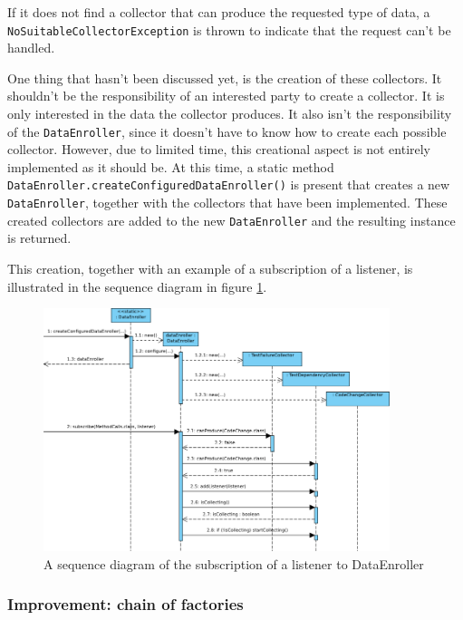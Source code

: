 \documentclass[i2]{oss}
\newcommand{\class}[1]{\texttt{#1}}
\newcommand{\method}[1]{\texttt{#1}}
\begin{document}
If it does not find a collector that can produce the requested type of data, a \class{NoSuitableCollectorException} is thrown to indicate that the request can't be handled.

One thing that hasn't been discussed yet, is the creation of these collectors.
It shouldn't be the responsibility of an interested party to create a collector. 
It is only interested in the data the collector produces.
It also isn't the responsibility of the \class{DataEnroller}, since it doesn't have to know how to create each possible collector.
However, due to limited time, this creational aspect is not entirely implemented as it should be.
At this time, a static method \method{DataEnroller.createConfiguredDataEnroller()} is present that creates a new \class{DataEnroller}, together with the collectors that have been implemented.
These created collectors are added to the new \class{DataEnroller} and the resulting instance is returned.

This creation, together with an example of a subscription of a listener, is illustrated in the sequence diagram in figure \ref{fig:sequence:subscribe-collector-listener}.

\begin{figure}[tbp]
\begin{center}
    \includegraphics[width=0.9\textwidth]{SubscribeToDataCollector}
    \caption{A sequence diagram of the subscription of a listener to DataEnroller}
	\label{fig:sequence:subscribe-collector-listener}
\end{center}
\end{figure}

\subsubsection{Improvement: chain of factories}
\end{document}
